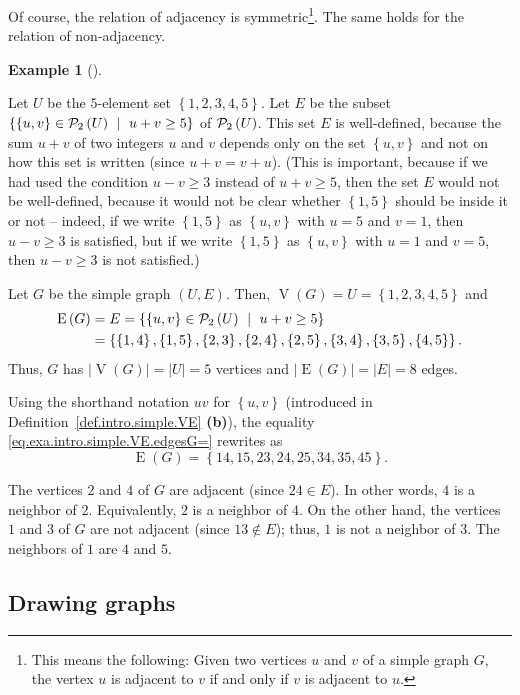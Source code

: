 \documentclass[numbers=enddot,12pt,final,onecolumn,notitlepage]{scrartcl}%
\theoremstyle{definition}
\newtheorem{exam}[theo]{Example}
\newenvironment{example}[1][]
{\begin{exam}[#1]\begin{leftbar}}
{\end{leftbar}\end{exam}}
\newcommand{\powset}[2][]{\ifthenelse{\equal{#2}{}}{\mathcal{P}\left(#1\right)}{\mathcal{P}_{#1}\left(#2\right)}}
\newcommand{\set}[1]{\left\{ #1 \right\}}
\newcommand{\abs}[1]{\left| #1 \right|}
\newcommand{\tup}[1]{\left( #1 \right)}
\newcommand{\verts}[1]{\operatorname{V}\left( #1 \right)}
\newcommand{\edges}[1]{\operatorname{E}\left( #1 \right)}
\begin{document}
Of course, the relation of adjacency is symmetric\footnote{This means
the following: Given two vertices $u$ and $v$ of a simple graph $G$,
the vertex $u$ is adjacent to $v$ if and only if $v$ is adjacent to
$u$.}. The same holds for the relation of non-adjacency.

\begin{example} \label{exa.intro.simple.VE}
Let $U$ be the $5$-element set $\set{1,2,3,4,5}$. Let $E$ be the
subset $\set{\set{u,v} \in \powset[2]{U} \ \mid \ u + v \geq 5 }$
of $\powset[2]{U}$. This set $E$ is well-defined, because the sum
$u + v$ of two integers $u$ and $v$ depends only on the set
$\set{u,v}$ and not on how this set is written (since
$u + v = v + u$). (This is important, because if we had used the
condition $u - v \geq 3$ instead of $u + v \geq 5$, then the set $E$
would not be well-defined, because it would not be clear whether
$\set{1, 5}$ should be inside it or not -- indeed, if we write
$\set{1, 5}$ as $\set{u, v}$ with $u = 5$ and $v = 1$, then
$u - v \geq 3$ is satisfied, but if we write $\set{1, 5}$ as
$\set{u, v}$ with $u = 1$ and $v = 5$, then $u - v \geq 3$ is not
satisfied.)

Let $G$ be the simple graph $\tup{U, E}$. Then, $\verts{G} = U
= \set{1,2,3,4,5}$ and
\begin{align}
\edges{G} &= E
= \set{\set{u,v} \in \powset[2]{U} \ \mid \ u + v \geq 5 }
\nonumber \\
&= \set{\set{1,4}, \set{1,5},
        \set{2,3}, \set{2,4}, \set{2,5},
        \set{3,4}, \set{3,5},
        \set{4,5}} .
\label{eq.exa.intro.simple.VE.edgesG=}
\end{align}
Thus, $G$ has $\abs{\verts{G}} = \abs{U} = 5$ vertices and
$\abs{\edges{G}} = \abs{E} = 8$ edges.

Using the shorthand notation
$uv$ for $\set{u, v}$ (introduced in
Definition~\ref{def.intro.simple.VE} \textbf{(b)}), the equality
\eqref{eq.exa.intro.simple.VE.edgesG=} rewrites as
\[
\edges{G}
= \set{14, 15, 23, 24, 25, 34, 35, 45} .
\]

The vertices $2$ and $4$ of $G$ are adjacent (since $24 \in E$).
In other words, $4$ is a neighbor of $2$. Equivalently, $2$ is a
neighbor of $4$. On the other hand, the vertices $1$ and $3$ of $G$
are not adjacent (since $13 \notin E$); thus, $1$ is not a neighbor
of $3$. The neighbors of $1$ are $4$ and $5$.
\end{example}

\subsection{\label{sect.intro.draw}Drawing graphs}
\end{document}
